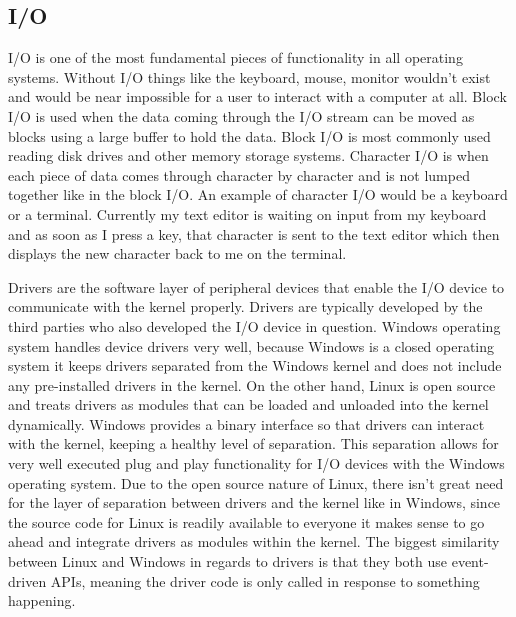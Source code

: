 \documentclass[10pt,serif,draftclsnofoot,onecolumn]{IEEEtran}
\begin{document}
	\subsection{I/O}
	\par
	I/O is one of the most fundamental pieces of functionality in all operating systems. Without I/O things like the keyboard, mouse, monitor wouldn't exist and would be near impossible for a user to interact with a computer at all. Block I/O is used when the data coming through the I/O stream can be moved as blocks using a large buffer to hold the data. Block I/O is most commonly used reading disk drives and other memory storage systems. Character I/O is when each piece of data comes through character by character and is not lumped together like in the block I/O. An example of character I/O would be a keyboard or a terminal. Currently my text editor is waiting on input from my keyboard and as soon as I press a key, that character is sent to the text editor which then displays the new character back to me on the terminal.
	\newline
	\par
	Drivers are the software layer of peripheral devices that enable the I/O device to communicate with the kernel properly. Drivers are typically developed by the third parties who also developed the I/O device in question. Windows operating system handles device drivers very well, because Windows is a closed operating system it keeps drivers separated from the Windows kernel and does not include any pre-installed drivers in the kernel. On the other hand, Linux is open source and treats drivers as modules that can be loaded and unloaded into the kernel dynamically\cite{12}. Windows provides a binary interface so that drivers can interact with the kernel, keeping a healthy level of separation. This separation allows for very well executed plug and play functionality for I/O devices with the Windows operating system. Due to the open source nature of Linux, there isn't great need for the layer of separation between drivers and the kernel like in Windows, since the source code for Linux is readily available to everyone it makes sense to go ahead and integrate drivers as modules within the kernel. The biggest similarity between Linux and Windows in regards to drivers is that they both use event-driven APIs, meaning the driver code is only called in response to something happening\cite{12}.
	\newline
	\par
\end{document}
